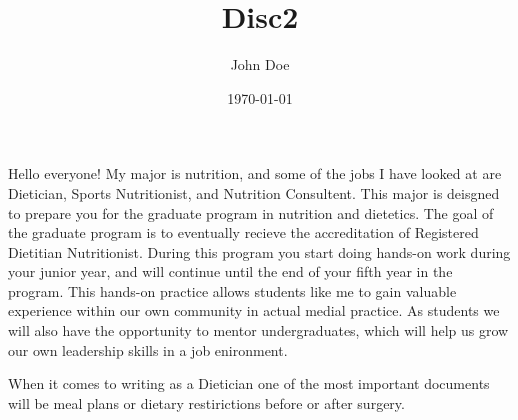 \documentclass[11pt]{article}
\author{John Doe}
\date{\today}
\title{Disc2}
\begin{document}
\maketitle
\tableofcontents

Hello everyone!
My major is nutrition, and some of the jobs I have looked at are Dietician, Sports Nutritionist, and Nutrition Consultent. This major is deisgned to prepare you for the graduate program in nutrition and dietetics. The goal of the graduate program is to eventually recieve the accreditation of Registered Dietitian Nutritionist. During this program you start doing hands-on work during your junior year, and will continue until the end of your fifth year in the program. This hands-on practice allows students like me to gain valuable experience within our own community in actual medial practice. As students we will also have the opportunity to mentor undergraduates, which will help us grow our own leadership skills in a job enironment.

When it comes to writing as a Dietician one of the most important documents will be meal plans or dietary restirictions before or after surgery. 
\end{document}
